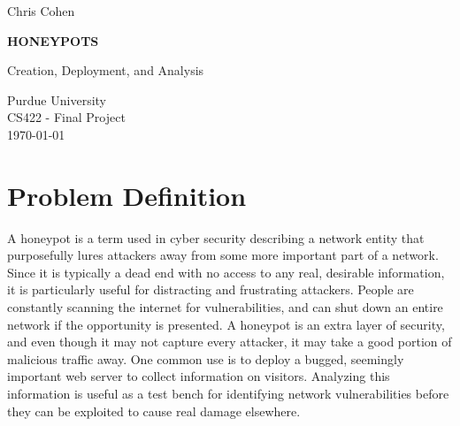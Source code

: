 \documentclass[12pt]{article}
\begin{document}
\begin{titlepage}
    \begin{center}
        \vspace*{1cm}
        \large
        Chris Cohen

        \vspace{6cm}
        \HUGE
        \textbf{HONEYPOTS}

        \Large
        Creation, Deployment, and Analysis\\

        \vfill

        \normalsize
        Purdue University\\
        CS422 - Final Project\\
        \today
            
    \end{center}
\end{titlepage}

\section{Problem Definition}
A honeypot is a term used in cyber security describing a network entity that purposefully lures attackers away from some more important part of a network.
Since it is typically a dead end with no access to any real, desirable information, it is particularly useful for distracting and frustrating attackers.
People are constantly scanning the internet for vulnerabilities, and can shut down an entire network if the opportunity is presented.
A honeypot is an extra layer of security, and even though it may not capture every attacker, it may take a good portion of malicious traffic away.
One common use is to deploy a bugged, seemingly important web server to collect information on visitors.
Analyzing this information is useful as a test bench for identifying network vulnerabilities before they can be exploited to cause real damage elsewhere.

\end{document}
